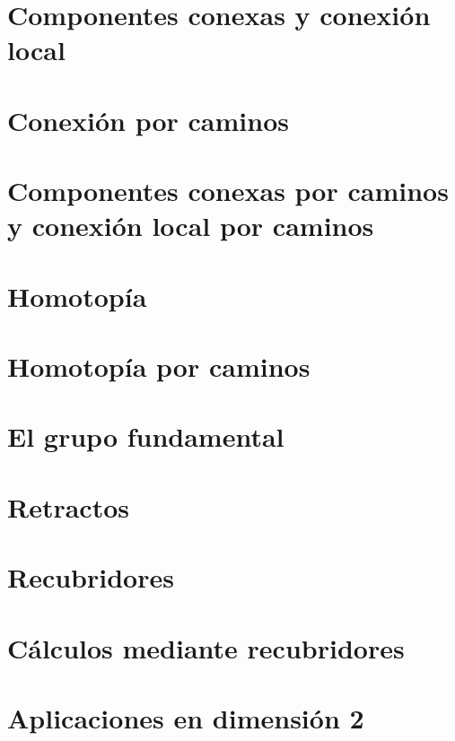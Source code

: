 \documentclass[10pt,a4paper,openright]{book}
\theoremstyle{break}
\begin{document}
\chapter{Componentes conexas y conexión local}%
\label{cha:componentes_conexas_y_conexion_local}

\chapter{Conexión por caminos}%
\label{cha:conexion_por_caminos}

\chapter{Componentes conexas por caminos y conexión local por caminos}%
\label{cha:componentes_conexas_por_caminos_y_conexion_local_por_caminos}

\chapter{Homotopía}%
\label{cha:homotopia}

\chapter{Homotopía por caminos}%
\label{cha:homotopia_por_caminos}

\chapter{El grupo fundamental}%
\label{cha:el_grupo_fundamental}

\chapter{Retractos}%
\label{cha:retractos}

\chapter{Recubridores}%
\label{cha:recubridores}

\chapter{Cálculos mediante recubridores}%
\label{cha:calculos_mediante_recubridores}

\chapter{Aplicaciones en dimensión 2}%
\label{cha:aplicaciones_en_dimension_2_}
\end{document}

